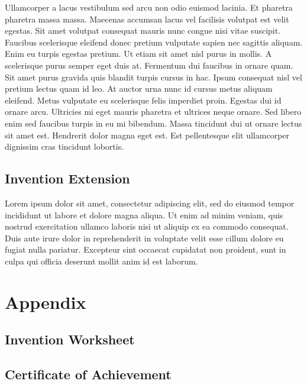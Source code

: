 \documentclass[]{book}
\begin{document}
Ullamcorper a lacus vestibulum sed arcu non odio euismod lacinia. Et
pharetra pharetra massa massa. Maecenas accumsan lacus vel facilisis
volutpat est velit egestas. Sit amet volutpat consequat mauris nunc
congue nisi vitae suscipit. Faucibus scelerisque eleifend donec pretium
vulputate sapien nec sagittis aliquam. Enim eu turpis egestas pretium.
Ut etiam sit amet nisl purus in mollis. A scelerisque purus semper eget
duis at. Fermentum dui faucibus in ornare quam. Sit amet purus gravida
quis blandit turpis cursus in hac. Ipsum consequat nisl vel pretium
lectus quam id leo. At auctor urna nunc id cursus metus aliquam
eleifend. Metus vulputate eu scelerisque felis imperdiet proin. Egestas
dui id ornare arcu. Ultricies mi eget mauris pharetra et ultrices neque
ornare. Sed libero enim sed faucibus turpis in eu mi bibendum. Massa
tincidunt dui ut ornare lectus sit amet est. Hendrerit dolor magna eget
est. Est pellentesque elit ullamcorper dignissim cras tincidunt
lobortis.

\subsection*{Invention Extension}\label{invention-extension}

Lorem ipsum dolor sit amet, consectetur adipiscing elit, sed do eiusmod
tempor incididunt ut labore et dolore magna aliqua. Ut enim ad minim
veniam, quis nostrud exercitation ullamco laboris nisi ut aliquip ex ea
commodo consequat. Duis aute irure dolor in reprehenderit in voluptate
velit esse cillum dolore eu fugiat nulla pariatur. Excepteur sint
occaecat cupidatat non proident, sunt in culpa qui officia deserunt
mollit anim id est laborum.

\section*{Appendix}\label{appendix}

\subsection*{Invention Worksheet}\label{invention-worksheet}

\subsection*{Certificate of
Achievement}\label{certificate-of-achievement}
\end{document}
